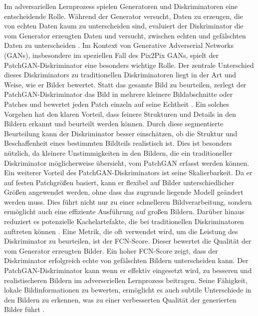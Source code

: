Im adversariellen Lernprozess spielen Generatoren und Diskriminatoren eine entscheidende Rolle. Während der Generator versucht, Daten zu erzeugen, die von echten Daten kaum zu unterscheiden sind, evaluiert der Diskriminator die vom Generator erzeugten Daten und versucht, zwischen echten und gefälschten Daten zu unterscheiden \cite{Isola}.\newline
Im Kontext von Generative Adverserial Networks (GANs), insbesondere im speziellen Fall des Pix2Pix GANs, spielt der PatchGAN-Diskriminator eine besonders wichtige Rolle. Der zentrale Unterschied dieses Diskriminators zu traditionellen Diskriminatoren liegt in der Art und Weise, wie er Bilder bewertet. Statt das gesamte Bild zu beurteilen, zerlegt der PatchGAN-Diskriminator das Bild in mehrere kleinere Bildabschnitte oder Patches und bewertet jeden Patch einzeln auf seine Echtheit \cite{Isola}. \newline
Ein solches Vorgehen hat den klaren Vorteil, dass feinere Strukturen und Details in den Bildern erkannt und beurteilt werden können. Durch diese segmentierte Beurteilung kann der Diskriminator besser einschätzen, ob die Struktur und Beschaffenheit eines bestimmten Bildteils realistisch ist. Dies ist besonders nützlich, da kleinere Unstimmigkeiten in den Bildern, die ein traditioneller Diskriminator möglicherweise übersieht, vom PatchGAN erfasst werden können. \newline
Ein weiterer Vorteil des PatchGAN-Diskriminators ist seine Skalierbarkeit. Da er auf festen Patchgrößen basiert, kann er flexibel auf Bilder unterschiedlicher Größen angewendet werden, ohne dass das zugrunde liegende Modell geändert werden muss. Dies führt nicht nur zu einer schnelleren Bildverarbeitung, sondern ermöglicht auch eine effiziente Ausführung auf großen Bildern. Darüber hinaus reduziert es potenzielle Kachelartefakte, die bei traditionellen Diskriminatoren auftreten können \cite{Isola}.\newline
Eine Metrik, die oft verwendet wird, um die Leistung des Diskriminator zu beurteilen, ist der FCN-Score. Dieser bewertet die Qualität der vom Generator erzeugten Bilder. Ein hoher FCN-Score zeigt, dass der Diskriminator erfolgreich echte von gefälschten Bildern unterscheiden kann. \newline
Der PatchGAN-Diskriminator kann wenn er effektiv eingesetzt wird, zu besseren und realistischeren Bildern im adverseriellen Lernprozess beitragen. Seine Fähigkeit, lokale Bildinformationen zu bewerten, ermöglicht es auch subtile Unterschiede in den Bildern zu erkennen, was zu einer verbesserten Qualität der generierten Bilder führt \cite{Isola}.

